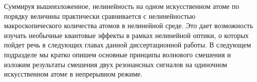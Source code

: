 Суммируя вышеизложенное, нелинейность на одном искусственном атоме по порядку величины практически сравнивается с нелинейностью макроскопического количества атомов в нелинейной среде. Это дает возможность изучать необычные квантовые эффекты в рамках нелинейной оптики, о которых пойдет речь в следующих главах данной диссертационной работы.  В следующем подразделе мы кратко опишем основные принципы волнового смешения и изложим результаты смешения двух резонансных сигналов на одиночном искусственном атоме в непрерывном режиме.




